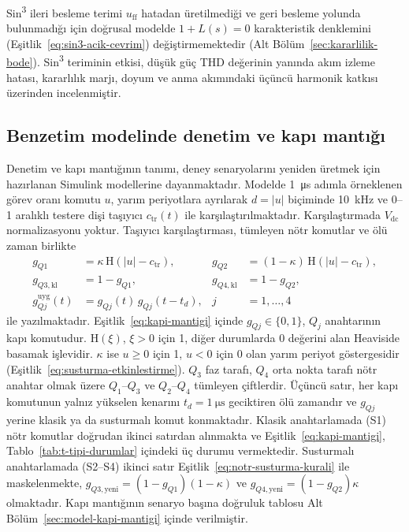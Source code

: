 Sin\textsuperscript{3} ileri besleme terimi $u_{\mathrm{ff}}$ hatadan üretilmediği ve geri besleme yolunda bulunmadığı için doğrusal modelde $1+L(s)=0$ karakteristik denklemini (Eşitlik~\eqref{eq:sin3-acik-cevrim}) değiştirmemektedir (Alt Bölüm~\ref{sec:kararlilik-bode}). Sin\textsuperscript{3} teriminin etkisi, düşük güç THD değerinin yanında akım izleme hatası, kararlılık marjı, doyum ve anma akımındaki üçüncü harmonik katkısı üzerinden incelenmiştir.

\subsection{Benzetim modelinde denetim ve kapı mantığı}
\label{sec:denetim-modelden}

Denetim ve kapı mantığının tanımı, deney senaryolarını yeniden üretmek için hazırlanan Simulink modellerine dayanmaktadır. Modelde \SI{1}{\micro\second} adımla örneklenen görev oranı komutu $u$, yarım periyotlara ayrılarak $d=|u|$ biçiminde \SI{10}{\kilo\hertz} ve 0--1 aralıklı testere dişi taşıyıcı $c_{\mathrm{tr}}(t)$ ile karşılaştırılmaktadır. Karşılaştırmada $V_{\mathrm{dc}}$ normalizasyonu yoktur. Taşıyıcı karşılaştırması, tümleyen nötr komutlar ve ölü zaman birlikte
\begin{equation}
  \begin{aligned}
    g_{Q1}&=\kappa\,\mathrm{H}\!\left(|u|-c_{\mathrm{tr}}\right), &
    g_{Q2}&=(1-\kappa)\,\mathrm{H}\!\left(|u|-c_{\mathrm{tr}}\right),\\
    g_{Q3,\mathrm{kl}}&=1-g_{Q1}, &
    g_{Q4,\mathrm{kl}}&=1-g_{Q2},\\
    g_{Qj}^{\mathrm{uyg}}(t)&=g_{Qj}(t)\,g_{Qj}(t-t_d), & j&=1,\ldots,4
  \end{aligned}
  \label{eq:kapi-mantigi}
\end{equation}
ile yazılmaktadır. Eşitlik~\eqref{eq:kapi-mantigi} içinde $g_{Qj}\in\{0,1\}$, $Q_j$ anahtarının kapı komutudur. $\mathrm{H}(\xi)$, $\xi>0$ için 1, diğer durumlarda 0 değerini alan Heaviside basamak işlevidir. $\kappa$ ise $u\geq0$ için 1, $u<0$ için 0 olan yarım periyot göstergesidir (Eşitlik~\eqref{eq:susturma-etkinlestirme}). $Q_3$ faz tarafı, $Q_4$ orta nokta tarafı nötr anahtar olmak üzere $Q_1$--$Q_3$ ve $Q_2$--$Q_4$ tümleyen çiftlerdir. Üçüncü satır, her kapı komutunun yalnız yükselen kenarını $t_d=\SI{1}{\micro\second}$ geciktiren ölü zamandır ve $g_{Qj}$ yerine klasik ya da susturmalı komut konmaktadır. Klasik anahtarlamada (S1) nötr komutlar doğrudan ikinci satırdan alınmakta ve Eşitlik~\eqref{eq:kapi-mantigi}, Tablo~\ref{tab:t-tipi-durumlar} içindeki üç durumu vermektedir. Susturmalı anahtarlamada (S2--S4) ikinci satır Eşitlik~\eqref{eq:notr-susturma-kurali} ile maskelenmekte, $g_{Q3,\mathrm{yeni}}=(1-g_{Q1})(1-\kappa)$ ve $g_{Q4,\mathrm{yeni}}=(1-g_{Q2})\kappa$ olmaktadır. Kapı mantığının senaryo başına doğruluk tablosu Alt Bölüm~\ref{sec:model-kapi-mantigi} içinde verilmiştir.


